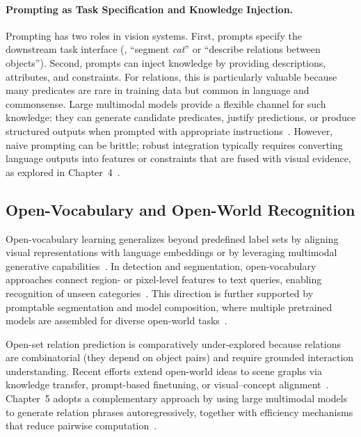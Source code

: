 \paragraph{Prompting as Task Specification and Knowledge Injection.}
Prompting has two roles in vision systems. First, prompts specify the downstream task interface (\eg, ``segment \emph{cat}'' or ``describe relations between objects''). Second, prompts can inject knowledge by providing descriptions, attributes, and constraints. For relations, this is particularly valuable because many predicates are rare in training data but common in language and commonsense. Large multimodal models provide a flexible channel for such knowledge: they can generate candidate predicates, justify predictions, or produce structured outputs when prompted with appropriate instructions~\citep{liu2024visual}. However, naive prompting can be brittle; robust integration typically requires converting language outputs into features or constraints that are fused with visual evidence, as explored in Chapter~4~\citep{zhou2025vlprompt}.

\subsection{Open-Vocabulary and Open-World Recognition}
Open-vocabulary learning generalizes beyond predefined label sets by aligning visual representations with language embeddings or by leveraging multimodal generative capabilities~\citep{wu2024towards}. In detection and segmentation, open-vocabulary approaches connect region- or pixel-level features to text queries, enabling recognition of unseen categories~\citep{du2022learning, ghiasi2022scaling, liang2023open, zhang2023simple}. This direction is further supported by promptable segmentation and model composition, where multiple pretrained models are assembled for diverse open-world tasks~\citep{kirillov2023segment, ren2024grounded}.

Open-set relation prediction is comparatively under-explored because relations are combinatorial (they depend on object pairs) and require grounded interaction understanding. Recent efforts extend open-world ideas to scene graphs via knowledge transfer, prompt-based finetuning, or visual--concept alignment~\citep{kan2021zero, yu2022zero, he2022towards, yu2023visually, chen2023expanding}. Chapter~5 adopts a complementary approach by using large multimodal models to generate relation phrases autoregressively, together with efficiency mechanisms that reduce pairwise computation~\citep{zhou2025openpsg}.

